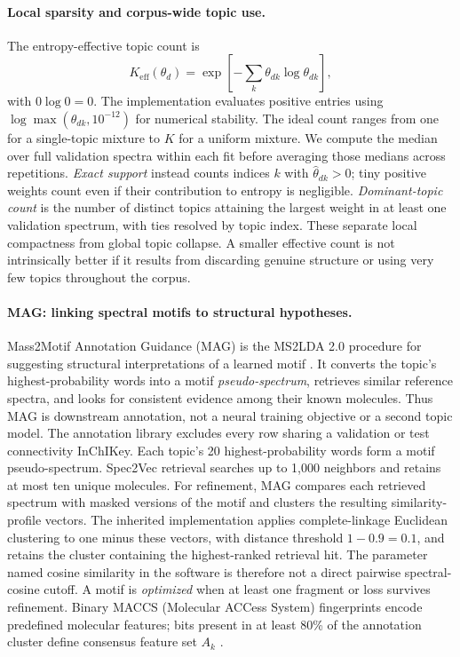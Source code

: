 \documentclass[10pt,a4paper]{article}
\begin{document}
\paragraph{Local sparsity and corpus-wide topic use.}
The entropy-effective topic count is
\begin{equation}
 K_{\mathrm{eff}}(\theta_d)
 =\exp\left[-\sum_k\theta_{dk}\log\theta_{dk}\right],
 \label{eq:effective}
\end{equation}
with $0\log0=0$. The implementation evaluates positive entries using
$\log\max(\theta_{dk},10^{-12})$ for numerical stability. The ideal count
ranges from one for a single-topic mixture to $K$ for
a uniform mixture. We compute the median over full validation spectra within
each fit before averaging those medians across repetitions. \emph{Exact
support} instead counts indices $k$ with $\widehat\theta_{dk}>0$; tiny positive
weights count even if their contribution to entropy is negligible.
\emph{Dominant-topic count} is the number of distinct topics attaining the
largest weight in at least one validation spectrum, with ties resolved by
topic index. These separate local compactness from global topic collapse.
A smaller effective count is not intrinsically better if it results from
discarding genuine structure or using very few topics throughout the corpus.

\paragraph{MAG: linking spectral motifs to structural hypotheses.}
Mass2Motif Annotation Guidance (MAG) is the MS2LDA 2.0 procedure for suggesting
structural interpretations of a learned motif \cite{torresortega2026}.
It converts the topic's highest-probability words into a motif
\emph{pseudo-spectrum}, retrieves similar reference spectra, and looks for
consistent evidence among their known molecules. Thus MAG is downstream
annotation, not a neural training objective or a second topic model.
The annotation library excludes every row sharing a validation or test
connectivity InChIKey. Each topic's 20 highest-probability words form a motif
pseudo-spectrum. Spec2Vec retrieval searches up to 1,000 neighbors and retains
at most ten unique molecules. For refinement, MAG compares each retrieved
spectrum with masked versions of the motif and clusters the resulting
similarity-profile vectors. The inherited implementation applies
complete-linkage Euclidean clustering to one minus these vectors, with
distance threshold $1-0.9=0.1$, and retains the cluster containing the
highest-ranked retrieval hit. The parameter named cosine similarity in the
software is therefore not a direct pairwise spectral-cosine cutoff.
A motif is \emph{optimized} when at least one fragment or
loss survives refinement. Binary MACCS (Molecular ACCess System) fingerprints encode predefined
molecular features; bits present in at least 80\%
of the annotation cluster define consensus feature set $A_k$
\cite{durant2002}.
\end{document}
